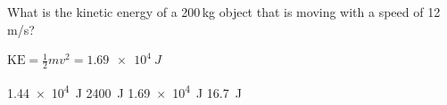 \documentclass[]{exam}
\begin{document}
\begin{questions}













\ifprintanswers \else \clearpage \fi 

\question %
What is the kinetic energy of a 200\,kg object that is moving with a speed of 12\,m/s?

\ifprintanswers
{\color{red} $\mathrm{KE} = \frac{1}{2}mv^2 = \boxed{\SI{1.69e4}{J}}$}
\fi

\begin{randomizechoices}
    \correctchoice \SI{1.44e4}{J}
    \choice \SI{2400}{J}
    \choice \SI{1.69e4}{J}
    \choice \SI{16.7}{J}
\end{randomizechoices}


\end{questions}
\end{document}
